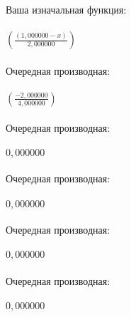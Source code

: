 \documentclass[12pt,a4paper]{scrartcl}
\begin{document}
Ваша изначальная функция: \\
\\{${(\frac{({1,000000}-{x})}{2,000000})}$}\\\\
Очередная производная: \\
\\{${(\frac{-2,000000}{4,000000})}$}\\\\
Очередная производная: \\
\\{${0,000000}$}\\\\
Очередная производная: \\
\\{${0,000000}$}\\\\
Очередная производная: \\
\\{${0,000000}$}\\\\
Очередная производная: \\
\\{${0,000000}$}\\\\
\end{document}
